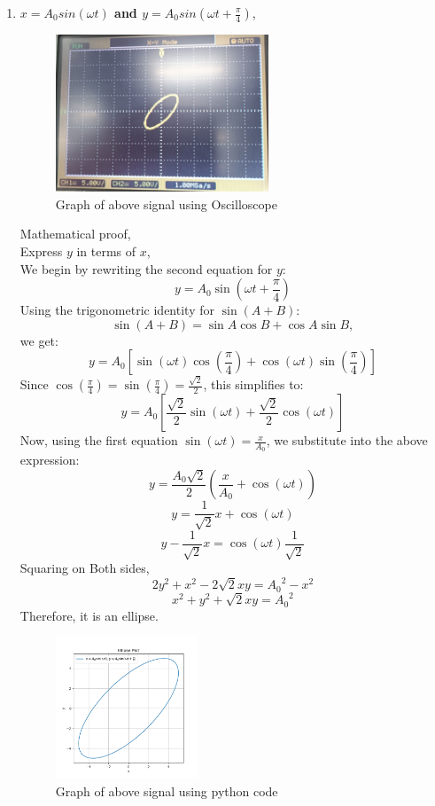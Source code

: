 \begin{enumerate}
\newpage
     
\item \textbf{\large \textbf{$x = A_0 sin(\omega t)$} and \textbf{$y = A_0 sin(\omega t + \frac{\pi}{4})$}},\\
     \begin{figure}[h!]
    \centering
    \includegraphics[width=0.6\textwidth]{actualgraph/ellipse.jpg}
    \caption{Graph of above signal using  Oscilloscope}
    \label{fig:sample_image}
    \end{figure}
Mathematical proof,\\
Express \( y \) in terms of \( x \),\\
We begin by rewriting the second equation for \( y \):
\[
y = A_0 \sin\left(\omega t + \frac{\pi}{4}\right)
\]
Using the trigonometric identity for \( \sin(A + B) \):
\[
\sin(A + B) = \sin A \cos B + \cos A \sin B,
\]
we get:
\[
y = A_0 \left[\sin(\omega t) \cos\left(\frac{\pi}{4}\right) + \cos(\omega t) \sin\left(\frac{\pi}{4}\right)\right]
\]
Since \( \cos\left(\frac{\pi}{4}\right) = \sin\left(\frac{\pi}{4}\right) = \frac{\sqrt{2}}{2} \), this simplifies to:
\[
y = A_0 \left[\frac{\sqrt{2}}{2} \sin(\omega t) + \frac{\sqrt{2}}{2} \cos(\omega t)\right]
\]
Now, using the first equation \( \sin(\omega t) = \frac{x}{A_0} \), we substitute into the above expression:
\[
y = \frac{A_0 \sqrt{2}}{2} \left( \frac{x}{A_0} + \cos(\omega t) \right)
\]
\[
y=\frac{1}{\sqrt{2}}x+\cos(\omega t)
\]
\[
y-\frac{1}{\sqrt{2}}x=\cos(\omega t)\frac{1}{\sqrt{2}}
\]
Squaring on Both sides,\\
\[
2y^2+x^2-2\sqrt{2}xy={A_0}^2-x^2
\]
\[
x^2+y^2+\sqrt{2}xy={A_0}^2
\]
Therefore, it is an ellipse.
  \begin{figure}[h!]
    \centering
    \includegraphics[width=0.4\textwidth]{graphs/Figure_1.png}
    \caption{Graph of above signal using python code}
    \label{fig:sample_image}
    \end{figure}









\end{enumerate}

